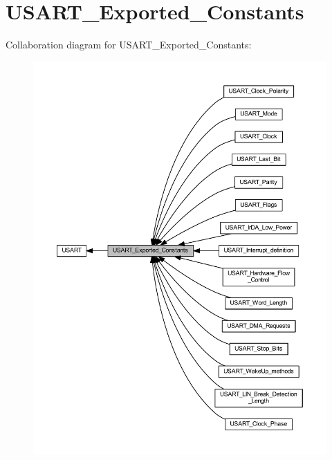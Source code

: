 \hypertarget{group___u_s_a_r_t___exported___constants}{}\section{U\+S\+A\+R\+T\+\_\+\+Exported\+\_\+\+Constants}
\label{group___u_s_a_r_t___exported___constants}
Collaboration diagram for U\+S\+A\+R\+T\+\_\+\+Exported\+\_\+\+Constants\+:\nopagebreak
\begin{figure}[H]
\begin{center}
\leavevmode
\includegraphics[width=350pt]{group___u_s_a_r_t___exported___constants}
\end{center}
\end{figure}
